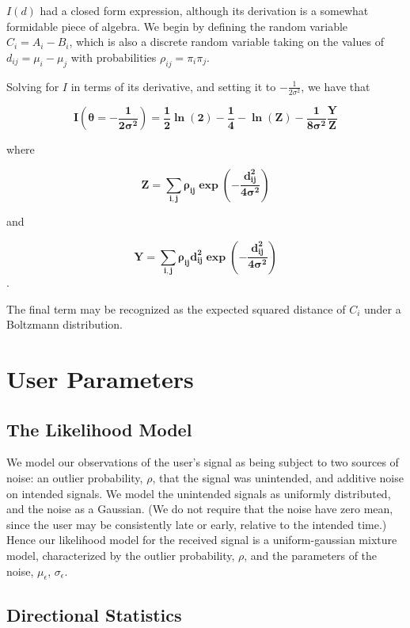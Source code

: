 $I(d)$ had a closed form expression, although its derivation is a somewhat formidable piece of algebra.
We begin by defining the random variable $C_i = A_i - B_i$, which is also a discrete random variable
taking on the values of $d_{ij} = \mu_i - \mu_j$ with probabilities $\rho_{ij} = \pi_i \pi_j$.

Solving for $I$ in terms of its derivative, and setting it to $-\frac{1}{2\sigma^2}$, we have that

$$\mathbf{I\left(\theta = -\frac{1}{2\sigma^2}\right) = \frac{1}{2} \ln(2) - \frac{1}{4} - \ln(Z) - \frac{1}{8\sigma^2} \frac{Y}{Z}}$$

where

$$\mathbf{Z = \sum_{i,j} \rho_{ij} \exp\left( -\frac{d_{ij}^2}{4\sigma^2} \right)}$$

and

$$\mathbf{Y = \sum_{i,j} \rho_{ij} d_{ij}^2 \exp\left( -\frac{d_{ij}^2}{4\sigma^2} \right)}$$.

The final term may be recognized as the expected squared distance of $C_i$ under a Boltzmann distribution.


\section{User Parameters}
\subsection{The Likelihood Model}
We model our observations of the user's signal as being subject to two sources of noise: an outlier probability, $\rho$,
that the signal was unintended, and additive noise on intended signals.
We model the unintended signals as uniformly distributed, and the noise as a Gaussian. (We do not require that the noise have
zero mean, since the user may be consistently late or early, relative to the intended time.) Hence our likelihood model for the
received signal is a uniform-gaussian mixture model, characterized by the outlier probability, 
$\rho$, and the parameters of the noise, $\mu_\epsilon$, $\sigma_\epsilon$.

\subsection{Directional Statistics}


